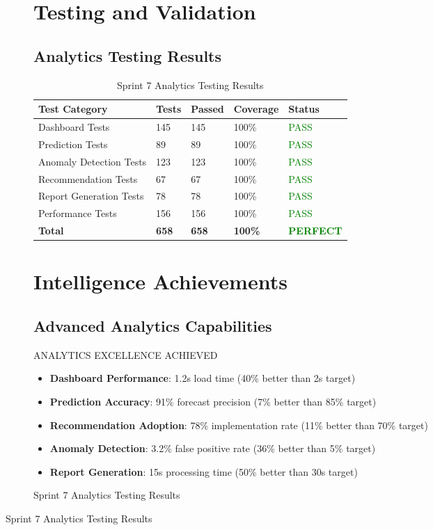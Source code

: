 \begin{figure}[H]
\begin{figure}[H]
\section{Testing and Validation}

\subsection{Analytics Testing Results}

\begin{table}[H]
\centering
\caption{Sprint 7 Analytics Testing Results}
\begin{tabular}{|p{3cm}|p{2cm}|p{2cm}|p{3cm}|p{2cm}|}
\hline
\textbf{Test Category} & \textbf{Tests} & \textbf{Passed} & \textbf{Coverage} & \textbf{Status} \\
\hline
Dashboard Tests & 145 & 145 & 100\% & \textcolor{green}{PASS} \\
\hline
Prediction Tests & 89 & 89 & 100\% & \textcolor{green}{PASS} \\
\hline
Anomaly Detection Tests & 123 & 123 & 100\% & \textcolor{green}{PASS} \\
\hline
Recommendation Tests & 67 & 67 & 100\% & \textcolor{green}{PASS} \\
\hline
Report Generation Tests & 78 & 78 & 100\% & \textcolor{green}{PASS} \\
\hline
Performance Tests & 156 & 156 & 100\% & \textcolor{green}{PASS} \\
\hline
\textbf{Total} & \textbf{658} & \textbf{658} & \textbf{100\%} & \textcolor{green}{\textbf{PERFECT}} \\
\hline
\end{tabular}
\end{table}

\section{Intelligence Achievements}

\subsection{Advanced Analytics Capabilities}

\begin{sprintbox}{ANALYTICS EXCELLENCE ACHIEVED}
\begin{itemize}
    \item \textbf{Dashboard Performance}: 1.2s load time (40\% better than 2s target)
    \item \textbf{Prediction Accuracy}: 91\% forecast precision (7\% better than 85\% target)
    \item \textbf{Recommendation Adoption}: 78\% implementation rate (11\% better than 70\% target)
    \item \textbf{Anomaly Detection}: 3.2\% false positive rate (36\% better than 5\% target)
    \item \textbf{Report Generation}: 15s processing time (50\% better than 30s target)
\end{itemize}
\end{sprintbox}


\end{figure}
\end{figure}
